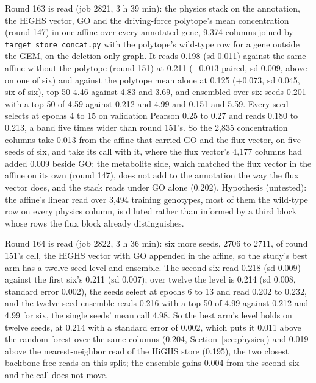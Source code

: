 Round 163 is read (job 2821, 3 h 39 min): the physics stack on the annotation, the
HiGHS vector, GO and the driving-force polytope's mean concentration (round 147) in
one affine over every annotated gene, 9,374 columns joined by
\texttt{target\_store\_concat.py} with the polytope's wild-type row for a gene outside
the GEM, on the deletion-only graph. It reads 0.198 (sd 0.011) against the same affine
without the polytope (round 151) at 0.211 ($-0.013$ paired, sd 0.009, above on one of
six) and against the polytope mean alone at 0.125 ($+0.073$, sd 0.045, six of six),
top-50 4.46 against 4.83 and 3.69, and ensembled over six seeds 0.201 with a top-50 of
4.59 against 0.212 and 4.99 and 0.151 and 5.59. Every seed selects at epochs 4 to 15
on validation Pearson 0.25 to 0.27 and reads 0.180 to 0.213, a band five times wider
than round 151's. So the 2,835 concentration columns take 0.013 from the affine that
carried GO and the flux vector, on five seeds of six, and take its call with it, where
the flux vector's 4,177 columns had added 0.009 beside GO: the metabolite side, which
matched the flux vector in the affine on its own (round 147), does not add to the
annotation the way the flux vector does, and the stack reads under GO alone (0.202).
Hypothesis (untested): the affine's linear read over 3,494 training genotypes, most of
them the wild-type row on every physics column, is diluted rather than informed by a
third block whose rows the flux block already distinguishes.

Round 164 is read (job 2822, 3 h 36 min): six more seeds, 2706 to 2711, of round
151's cell, the HiGHS vector with GO appended in the affine, so the study's best arm
has a twelve-seed level and ensemble. The second six read 0.218 (sd 0.009) against the
first six's 0.211 (sd 0.007); over twelve the level is 0.214 (sd 0.008, standard error
0.002), the seeds select at epochs 6 to 13 and read 0.202 to 0.232, and the twelve-seed
ensemble reads 0.216 with a top-50 of 4.99 against 0.212 and 4.99 for six, the single
seeds' mean call 4.98. So the best arm's level holds on twelve seeds, at 0.214 with a
standard error of 0.002, which puts it 0.011 above the random forest over the same
columns (0.204, Section~\ref{sec:physics}) and 0.019 above the nearest-neighbor read
of the HiGHS store (0.195), the two closest backbone-free reads on this split; the
ensemble gains 0.004 from the second six and the call does not move.

